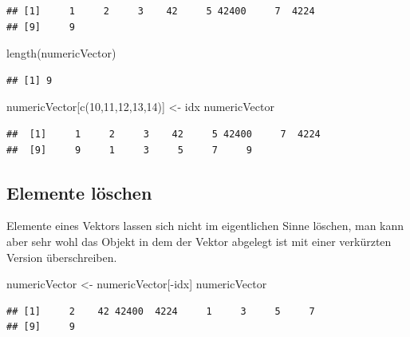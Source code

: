 \documentclass[
]{book}
\newenvironment{Shaded}{\begin{snugshade}}{\end{snugshade}}
\newcommand{\DecValTok}[1]{\textcolor[rgb]{0.00,0.00,0.81}{#1}}
\newcommand{\FunctionTok}[1]{\textcolor[rgb]{0.00,0.00,0.00}{#1}}
\newcommand{\NormalTok}[1]{#1}
\newcommand{\OtherTok}[1]{\textcolor[rgb]{0.56,0.35,0.01}{#1}}
\newcommand{\SpecialCharTok}[1]{\textcolor[rgb]{0.00,0.00,0.00}{#1}}
\begin{document}
\begin{verbatim}
## [1]     1     2     3    42     5 42400     7  4224
## [9]     9
\end{verbatim}

\begin{Shaded}
\begin{Highlighting}[]
\FunctionTok{length}\NormalTok{(numericVector)}
\end{Highlighting}
\end{Shaded}

\begin{verbatim}
## [1] 9
\end{verbatim}

\begin{Shaded}
\begin{Highlighting}[]
\NormalTok{numericVector[}\FunctionTok{c}\NormalTok{(}\DecValTok{10}\NormalTok{,}\DecValTok{11}\NormalTok{,}\DecValTok{12}\NormalTok{,}\DecValTok{13}\NormalTok{,}\DecValTok{14}\NormalTok{)] }\OtherTok{\textless{}{-}}\NormalTok{ idx}
\NormalTok{numericVector}
\end{Highlighting}
\end{Shaded}

\begin{verbatim}
##  [1]     1     2     3    42     5 42400     7  4224
##  [9]     9     1     3     5     7     9
\end{verbatim}

\hypertarget{elemente-luxf6schen}{%
\subsection{Elemente löschen}\label{elemente-luxf6schen}}

Elemente eines Vektors lassen sich nicht im eigentlichen Sinne löschen, man kann aber sehr wohl das Objekt in dem der Vektor abgelegt ist mit einer verkürzten Version überschreiben.

\begin{Shaded}
\begin{Highlighting}[]
\NormalTok{numericVector }\OtherTok{\textless{}{-}}\NormalTok{ numericVector[}\SpecialCharTok{{-}}\NormalTok{idx]}
\NormalTok{numericVector}
\end{Highlighting}
\end{Shaded}

\begin{verbatim}
## [1]     2    42 42400  4224     1     3     5     7
## [9]     9
\end{verbatim}
\end{document}
